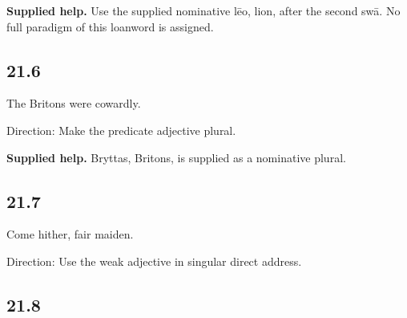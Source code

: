 \textbf{Supplied help.} Use the supplied nominative lēo, lion, after the second swā. No full paradigm of this loanword is assigned.

\subsection*{21.6}

\par\begin{minipage}{\linewidth}\raggedright
The Britons were cowardly.

Direction: Make the predicate adjective plural.

\end{minipage}\par\addvspace{4pt}

\textbf{Supplied help.} Bryttas, Britons, is supplied as a nominative plural.

\subsection*{21.7}

\par\begin{minipage}{\linewidth}\raggedright
Come hither, fair maiden.

Direction: Use the weak adjective in singular direct address.

\end{minipage}\par\addvspace{4pt}

\subsection*{21.8}

